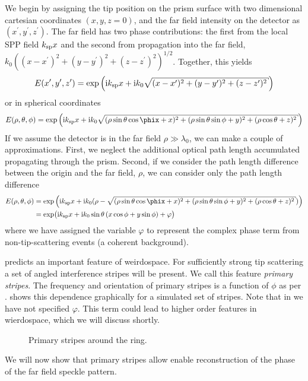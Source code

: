 We begin by assigning the tip position on the
prism surface with two dimensional cartesian coordinates $(x,y,z=0)$, and
the far field intensity on the detector as $(x^\prime,y^\prime,z^\prime)$.
The far field has two phase contributions: the first from the local SPP field
$k_\mathrm{sp} x$ and the second from propagation into the far field,
$k_0\left((x-x^\prime)^2+ (y-y^\prime)^2+
(z-z^\prime)^2\right)^{1/2}$.  Together, this yields
\begin{equation}
E(x^\prime,y^\prime,z^\prime) = \exp\left( \mi\ksp x + %
\mi k_0\sqrt{ (x-x^\prime)^2+ (y-y^\prime)^2+ (z-z^\prime)^2 } \right)
\end{equation}
or in spherical coordinates
\begin{equation}
E(\rho,\theta,\phi) = \exp\left( \mi\ksp x + %
\mi k_0\sqrt{
(\rho\sin\theta\cos\phix+x)^2+(\rho\sin\theta\sin\phi+y)^2+(\rho\cos\theta+z)^2 } \right)
\end{equation}
If we assume the detector is in the far field $\rho\gg\lambda_0$, we can
make a couple of approximations.  First, we neglect the additional optical
path length accumulated propagating through the prism.  Second, if we
consider the path length difference between the origin and the far field,
$\rho$, we can consider only the path length difference
\begin{align}
E(\rho,\theta,\phi) &= \exp\left( \mi\ksp x + %
\mi k_0(\rho-\sqrt{ (\rho\sin\theta\cos\phix+x)^2+(\rho\sin\theta\sin\phi+y)^2+(\rho\cos\theta+z)^2
}) \right)\\
&= \exp\!\big( \mi \ksp x
 + \mi k_0 \sin\theta \left(x\cos\phi+y\sin\phi\right)
 + \varphi\big)
	\label{eqn:primarystripes}
\end{align}
where we have assigned the variable $\varphi$ to represent the complex phase term
from non-tip-scattering events (a coherent background).  

 predicts an important feature of weirdospace.
For sufficiently strong tip scattering a set of angled interference stripes
will be present.  We call this feature \textit{primary stripes}.  The
frequency and orientation of primary stripes is a function of $\phi$ as per
.   shows this
dependence graphically for a simulated set of stripes.  Note that in
 we have not specified $\varphi$.  This term
could lead to higher order features in wierdospace, which we will discuss
shortly.
\begin{figure}
\centering
\caption{Primary stripes around the ring.}
\label{fig:primarystripes}
\end{figure}

We will now show that primary stripes allow enable reconstruction of the
phase of the far field speckle pattern.  
